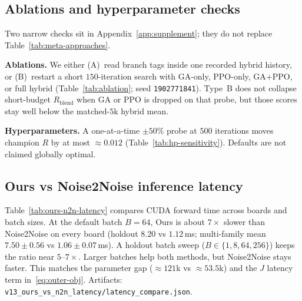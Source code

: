 \subsection{Ablations and hyperparameter checks}
\label{sec:ablation-def}
\label{sec:ablation-hp-main}

Two narrow checks sit in Appendix~\ref{app:supplement}; they do not replace Table~\ref{tab:meta-approaches}.

\textbf{Ablations.}
We either (A)~read branch tags inside one recorded hybrid history, or
(B)~restart a short $150$-iteration search with GA-only, PPO-only, GA+PPO, or full hybrid
(Table~\ref{tab:ablation}; seed \texttt{1902771841}).
Type~B does not collapse short-budget $R_{\mathrm{blend}}$ when GA or PPO is dropped on that probe,
but those scores stay well below the matched-$5$k hybrid mean.

\textbf{Hyperparameters.}
A one-at-a-time $\pm 50\%$ probe at $500$ iterations moves champion $R$ by at most ${\approx}0.012$
(Table~\ref{tab:hp-sensitivity}).
Defaults are not claimed globally optimal.

\subsection{Ours vs Noise2Noise inference latency}
\label{sec:ours-n2n-latency}

Table~\ref{tab:ours-n2n-latency} compares CUDA forward time across boards and batch sizes.
At the default batch $B{=}64$, Ours is about $7\times$ slower than Noise2Noise on every board
(holdout $8.20$ vs $1.12$\,ms; multi-family mean $7.50{\pm}0.56$ vs $1.06{\pm}0.07$\,ms).
A holdout batch sweep ($B\in\{1,8,64,256\}$) keeps the ratio near $5$--$7\times$.
Larger batches help both methods, but Noise2Noise stays faster.
This matches the parameter gap (${\approx}121$k vs ${\approx}53.5$k) and the $J$ latency term in~\eqref{eq:outer-obj}.
Artifacts: \texttt{v13\_ours\_vs\_n2n\_latency/latency\_compare.json}.

